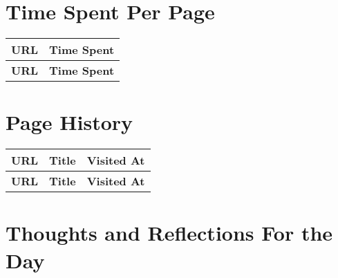 \documentclass{book}
\begin{document}
\section*{Time Spent Per Page}
\begin{longtable}{@{}L{0.65\textwidth}L{0.3\textwidth}@{}}
\toprule
\textbf{URL} & \textbf{Time Spent} \\
\midrule
\endfirsthead
\toprule
\textbf{URL} & \textbf{Time Spent} \\
\midrule
\endhead
\end{longtable}

\section*{Page History}
{
	\small
	\begin{longtable}{@{}L{0.3\textwidth}L{0.4\textwidth}L{0.25\textwidth}@{}}
	\toprule
	\textbf{URL} & \textbf{Title} & \textbf{Visited At} \\
	\midrule
	\endfirsthead
	\toprule
	\textbf{URL} & \textbf{Title} & \textbf{Visited At} \\
	\midrule
	\endhead
	\end{longtable}
}

\pagebreak

\section*{Thoughts and Reflections For the Day}
\end{document}
